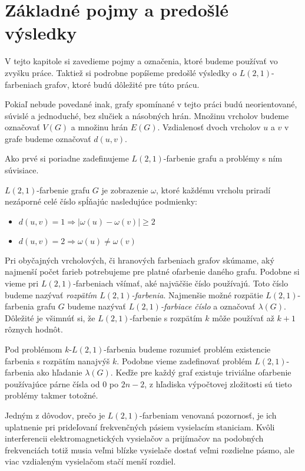 \chapter{Základné pojmy a predošlé výsledky}

V tejto kapitole si zavedieme pojmy a označenia, ktoré budeme používať
vo zvyšku práce. Taktiež si podrobne popíšeme predošlé výsledky o
$L(2,1)$-farbeniach grafov, ktoré budú dôležité pre túto prácu.

Pokiaľ nebude povedané inak, grafy spomínané v tejto práci budú neorientované,
súvislé a jednoduché, bez slučiek a násobných hrán. Množinu vrcholov budeme
označovať $V(G)$ a množinu hrán $E(G)$. Vzdialenosť dvoch vrcholov $u$ a $v$
v grafe budeme označovať $d(u,v)$. 

Ako prvé si poriadne
zadefinujeme $L(2,1)$-farbenie grafu a problémy s ním súvisiace.

\begin{defn}
$L(2,1)$-farbenie grafu $G$ je zobrazenie $\omega$, ktoré každému vrcholu priradí
nezáporné celé číslo spĺňajúc nasledujúce podmienky:

\begin{itemize}
\item $d(u, v) = 1 \Rightarrow \left| \omega(u) - \omega(v) \right| \ge 2$
\item $d(u, v) = 2 \Rightarrow \omega(u) \neq \omega(v)$
\end{itemize}
\end{defn}

Pri obyčajných vrcholových, či hranových farbeniach grafov skúmame, aký
najmenší počet farieb potrebujeme pre platné ofarbenie daného grafu. Podobne
si vieme pri $L(2,1)$-farbeniach všímať, aké najväčšie číslo používajú. Toto
číslo budeme nazývať \emph{rozpätím $L(2,1)$-farbenia}. Najmenšie možné rozpätie
$L(2,1)$-farbenia grafu $G$ budeme nazývať \emph{$L(2,1)$-farbiace číslo} a
označovať $\lambda(G)$. Dôležité je všimnúť si, že $L(2,1)$-farbenie s
rozpätím $k$ môže používať až $k+1$ rôznych hodnôt.

Pod problémom $k$-$L(2,1)$-farbenia budeme rozumieť problém existencie farbenia
s rozpätím nanajvýš $k$. Podobne vieme zadefinovať problém $L(2,1)$-farbenia ako
hľadanie $\lambda(G)$. Keďže pre každý graf existuje triviálne ofarbenie
používajúce párne čísla od $0$ po $2n - 2$, z hľadiska výpočtovej zložitosti
sú tieto problémy takmer totožné.

Jedným z dôvodov, prečo je $L(2,1)$-farbeniam venovaná pozornosť, je ich uplatnenie
pri prideľovaní frekvenčných pásiem vysielacím staniciam. Kvôli interferencii
elektromagnetických vysielačov a prijímačov na podobných frekvenciách totiž
musia veľmi blízke vysielače dostať veľmi rozdielne pásmo, ale viac vzdialeným
vysielačom stačí menší rozdiel.

